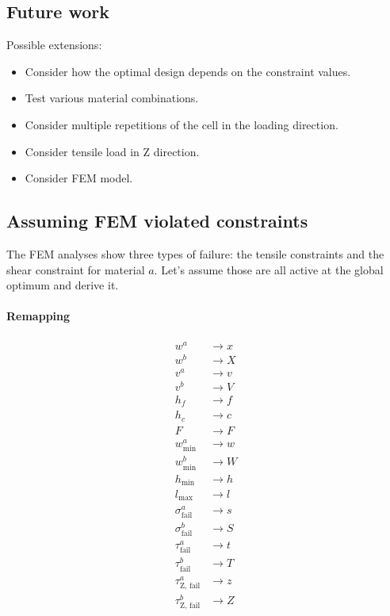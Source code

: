 \subsection{Future work}
Possible extensions:
\begin{itemize}
	\item Consider how the optimal design depends on the constraint values.
	\item Test various material combinations.
	\item Consider multiple repetitions of the cell in the loading direction.
	\item Consider tensile load in Z direction.
	\item Consider FEM model.
\end{itemize}

\subsection{Assuming FEM violated constraints}

The FEM analyses show three types of failure: the tensile constraints and the shear constraint for material $a$.
Let's assume those are all active at the global optimum and derive it.

\iffalse
\paragraph{Remapping}
\begin{align*}
	w^a &\to x \\
	w^b &\to X \\
	v^a &\to v \\
	v^b &\to V \\
	h_f &\to f \\
	h_c &\to c \\
	F &\to F \\
	w^a_\text{min} &\to w \\
	w^b_\text{min} &\to W \\
	h_\text{min} &\to h \\
	l_\text{max} &\to l \\
	\sigma^a_\text{fail} &\to s\\
	\sigma^b_\text{fail} &\to S\\
	\tau^a_\text{fail} &\to t\\
	\tau^b_\text{fail} &\to T\\
	\tau^a_\text{Z, fail} &\to z\\
	\tau^b_\text{Z, fail} &\to Z
\end{align*}

